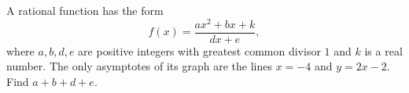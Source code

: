 A rational function has the form
\[
f(x)=\dfrac{ax^2+bx+k}{dx+e},
\]
where $a,b,d,e$ are positive integers with greatest common divisor $1$ and $k$ is a real number. The only asymptotes of its graph are the lines $x=-4$ and $y=2x-2$. Find $a+b+d+e$.
